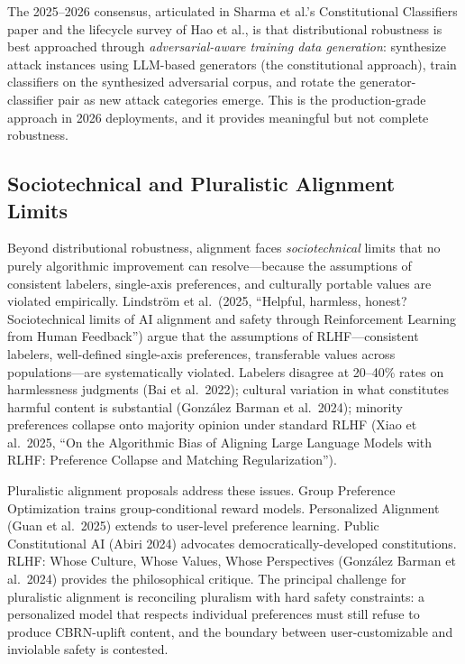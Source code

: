 \documentclass{article}
\begin{document}
The 2025--2026 consensus, articulated in Sharma et al.'s Constitutional Classifiers paper and the lifecycle survey of Hao et al., is that distributional robustness is best approached through \emph{adversarial-aware training data generation}: synthesize attack instances using LLM-based generators (the constitutional approach), train classifiers on the synthesized adversarial corpus, and rotate the generator-classifier pair as new attack categories emerge. This is the production-grade approach in 2026 deployments, and it provides meaningful but not complete robustness.

\subsection{Sociotechnical and Pluralistic Alignment Limits}\label{sociotechnical-and-pluralistic-alignment-limits}

Beyond distributional robustness, alignment faces \emph{sociotechnical} limits that no purely algorithmic improvement can resolve---because the assumptions of consistent labelers, single-axis preferences, and culturally portable values are violated empirically. Lindström et al.~(2025, ``Helpful, harmless, honest? Sociotechnical limits of AI alignment and safety through Reinforcement Learning from Human Feedback'') argue that the assumptions of RLHF---consistent labelers, well-defined single-axis preferences, transferable values across populations---are systematically violated. Labelers disagree at 20--40\% rates on harmlessness judgments (Bai et al.~2022); cultural variation in what constitutes harmful content is substantial (González Barman et al.~2024); minority preferences collapse onto majority opinion under standard RLHF (Xiao et al.~2025, ``On the Algorithmic Bias of Aligning Large Language Models with RLHF: Preference Collapse and Matching Regularization'').

Pluralistic alignment proposals address these issues. Group Preference Optimization \citep{zhao2023arxiv2310115232023} trains group-conditional reward models. Personalized Alignment (Guan et al.~2025) extends to user-level preference learning. Public Constitutional AI (Abiri 2024) advocates democratically-developed constitutions. RLHF: Whose Culture, Whose Values, Whose Perspectives (González Barman et al.~2024) provides the philosophical critique. The principal challenge for pluralistic alignment is reconciling pluralism with hard safety constraints: a personalized model that respects individual preferences must still refuse to produce CBRN-uplift content, and the boundary between user-customizable and inviolable safety is contested.
\end{document}
